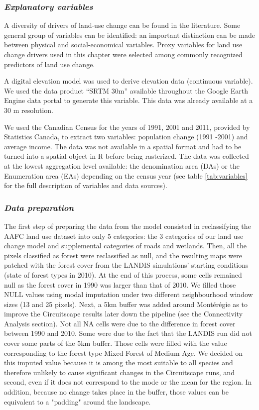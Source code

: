 \subsubsection*{\textit{Explanatory variables}}

A diversity of drivers of land-use change can be found in the literature. Some general group of variables can be identified: an important distinction can be made between physical and social-economical variables. Proxy variables for land use change drivers used in this chapter were selected among commonly recognized predictors of land use change.

A digital elevation model was used to derive elevation data (continuous variable). We used the data product “SRTM 30m” available throughout the Google Earth Engine data portal to generate this variable. This data was already available at a 30 m resolution. 

We used the Canadian Census for the years of 1991, 2001 and 2011, provided by Statistics Canada, to extract two variables: population change (1991 -2001) and average income. The data was not available in a spatial format and had to be turned into a spatial object in R before being rasterized. The data was collected at the lowest aggregation level available: the denomination area (DAs) or the Enumeration area (EAs) depending on the census year (see table \ref{tab:variables} for the full description of variables and data sources).\\

\subsubsection*{\textit{Data preparation}}

The first step of preparing the data from the model consisted in reclassifying the AAFC land use dataset into only 5 categories: the 3 categories of our land use change model and supplemental categories of roads and wetlands. Then, all the pixels classified as forest were reclassified as null, and the resulting maps were patched with the forest cover from the LANDIS simulations' starting conditions (state of forest types in 2010). At the end of this process, some cells remained null as the forest cover in 1990 was larger than that of 2010. We filled those NULL values using modal imputation under two different neighbourhood window sizes (13 and 25 pixels). Next, a 5km buffer was added around Montérégie as to improve the Circuitscape results later down the pipeline (see the Connectivity Analysis section). Not all NA cells were due to the difference in forest cover between 1990 and 2010. Some were due to the fact that the LANDIS run did not cover some parts of the 5km buffer. Those cells were filled with the value corresponding to the forest type Mixed Forest of Medium Age. We decided on this imputed value because it is among the most suitable to all species and therefore unlikely to cause significant changes in the Circuitscape runs, and second, even if it does not correspond to the mode or the mean for the region. In addition, because no change takes place in the buffer, those values can be equivalent to a "padding" around the landscape. 

